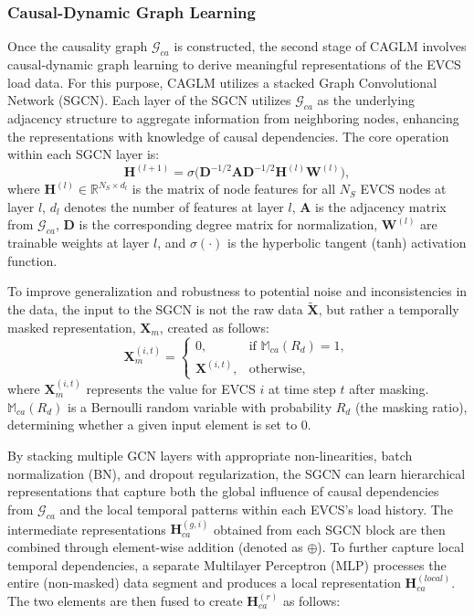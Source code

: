 \documentclass[lettersize,journal]{IEEEtran}
\begin{document}
\subsubsection{Causal-Dynamic Graph Learning}
Once the causality graph $\bm{\mathcal{G}}_{ca}$ is constructed, the second stage of CAGLM involves causal-dynamic graph learning to derive meaningful representations of the EVCS load data. For this purpose, CAGLM utilizes a stacked Graph Convolutional Network (SGCN). Each layer of the SGCN utilizes $\bm{\mathcal{G}}_{ca}$ as the underlying adjacency structure to aggregate information from neighboring nodes, enhancing the representations with knowledge of causal dependencies. The core operation within each SGCN layer is:
\begin{equation}
\bm{H}^{(l+1)} = \sigma \Big( \bm{D}^{-1/2} \bm{A} \bm{D}^{-1/2} \bm{H}^{(l)} \bm{W}^{(l)} \Big),
\label{eq:gcn_layer}
\end{equation}
where $\bm{H}^{(l)} \in \mathbb{R}^{N_S \times d_l}$ is the matrix of node features for all $N_S$ EVCS nodes at layer $l$, $d_l$ denotes the number of features at layer $l$, $\bm{A}$ is the adjacency matrix from $\bm{\mathcal{G}}_{ca}$, $\bm{D}$ is the corresponding degree matrix for normalization, $\bm{W}^{(l)}$ are trainable weights at layer $l$, and $\sigma(\cdot)$ is the hyperbolic tangent (tanh) activation function.

To improve generalization and robustness to potential noise and inconsistencies in the data, the input to the SGCN is not the raw data $\tilde{\bm{X}}$, but rather a temporally masked representation, $\bm{X}_{m}$, created as follows:
\begin{equation}
\bm{X}_m^{(i,t)} =
\begin{cases}
0, & \text{if } \mathbb{M}_{ca}(R_d) = 1, \\
\bm{X}^{(i,t)}, & \text{otherwise},
\end{cases}
\label{eq:temporal_masking}
\end{equation}
where $\bm{X}_m^{(i,t)}$ represents the value for EVCS $i$ at time step $t$ after masking. $\mathbb{M}_{ca}(R_d)$ is a Bernoulli random variable with probability $R_d$ (the masking ratio), determining whether a given input element is set to 0.



By stacking multiple GCN layers with appropriate non-linearities, batch normalization (BN), and dropout regularization, the SGCN can learn hierarchical representations that capture both the global influence of causal dependencies from $\bm{\mathcal{G}}_{ca}$ and the local temporal patterns within each EVCS’s load history.
The intermediate representations $\bm{H}^{(g, i)}_{ca}$ obtained from each SGCN block are then combined through element-wise addition (denoted as $\oplus$). To further capture local temporal dependencies, a separate Multilayer Perceptron (MLP) processes the entire (non-masked) data segment and produces a local representation $\bm{H}^{(local)}_{ca}$. The two elements are then fused to create $\bm{H}^{(r)}_{ca}$ as follows:
\end{document}
